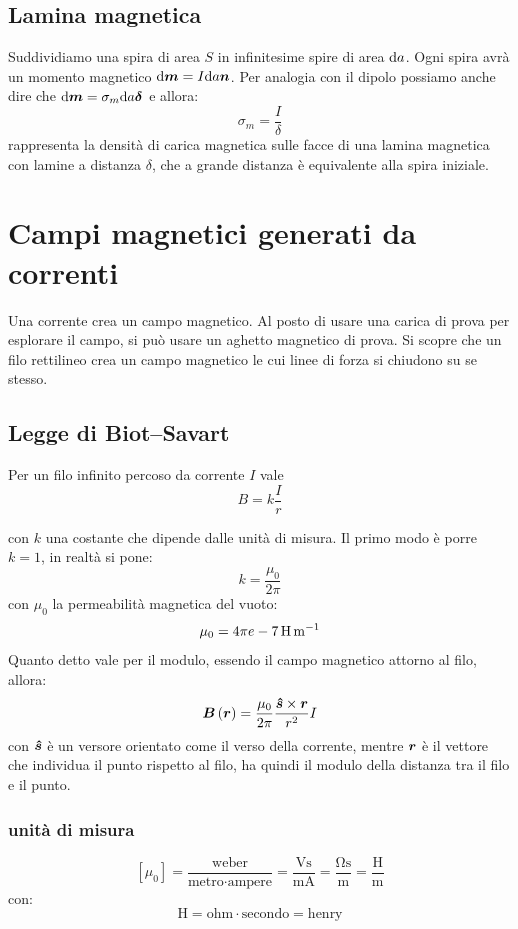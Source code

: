 \subsection{Lamina magnetica}
Suddividiamo una spira di area $S$ in infinitesime spire di area $\mathrm{d} a$. Ogni spira avrà un momento magnetico $\mathrm{d}\boldsymbol{m}=I\mathrm{d} a\boldsymbol{n}$. Per analogia con il dipolo possiamo anche dire che $\mathrm{d}\boldsymbol{m}=\sigma_m\mathrm{d} a \boldsymbol{\delta}$ e allora:
\[\sigma_m=\frac{I}{\delta}\]
rappresenta la densità di carica magnetica sulle facce di una lamina magnetica con lamine a distanza $\delta$, che a grande distanza è equivalente alla spira iniziale.

\section{Campi magnetici generati da correnti}
Una corrente crea un campo magnetico. Al posto di usare una carica di prova per esplorare il campo, si può usare un aghetto magnetico di prova. Si scopre che un filo rettilineo crea un campo magnetico le cui linee di forza si chiudono su se stesso.
\subsection{Legge di Biot--Savart}
\begin{legge}
  Per un filo infinito percoso da corrente $I$ vale
  \begin{equation}
    B=k\frac{I}{r}
  \end{equation}
\end{legge}
con $k$ una costante che dipende dalle unità di misura. Il primo modo è porre $k=1$, in realtà si pone:
\[k=\frac{\mu_0}{2\pi}\]
con $\mu_0$ la permeabilità magnetica del vuoto:
\[
  \mu_0=\SI[parse-numbers = false]{4\pi e-7}{\henry\per\meter}
\]
Quanto detto vale per il modulo, essendo il campo magnetico attorno al filo, allora:
\[\boldsymbol{B}\left(\boldsymbol{r}\right)=\frac{\mu_0}{2\pi}\frac{\boldsymbol{\hat {s}}\times\boldsymbol{r}}{r^2}I\]
con $\boldsymbol{\hat {s}}$ è un versore orientato come il verso della corrente, mentre $\boldsymbol{r}$ è il vettore che individua il punto rispetto al filo, ha quindi il modulo della distanza tra il filo e il punto.
\subsubsection{unità di misura}
\[\left[\mu_0\right]=\frac{\text{weber}}{\text{metro}\cdot\text{ampere}}=\frac{\si{\volt\second}}{\si{\meter\ampere}}=\frac{\si{\ohm\second}}{\si{\meter}}=\frac{\si{\henry}}{\si{\meter}}\]
con:
\[\si{\henry}=\text{ohm}\cdot\text{secondo}=\text{henry}\]
